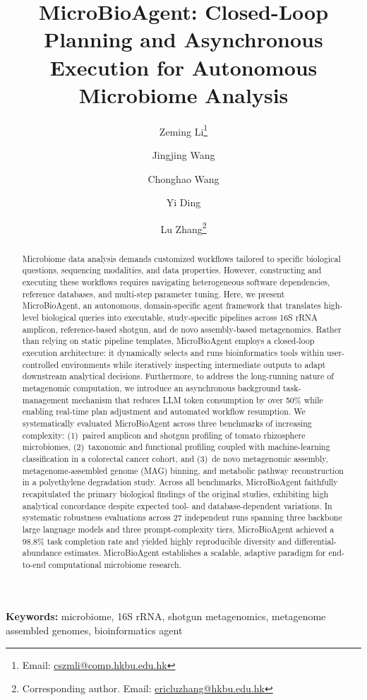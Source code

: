 \documentclass[10pt,letterpaper]{article}
\title{MicroBioAgent: Closed-Loop Planning and Asynchronous Execution for Autonomous Microbiome Analysis}
\author[1]{Zeming Li\thanks{Email: \url{cszmli@comp.hkbu.edu.hk}}}
\author[1]{Jingjing Wang}
\author[1]{Chonghao Wang}
\author[1]{Yi Ding}
\author[1]{Lu Zhang\thanks{Corresponding author. Email: \url{ericluzhang@hkbu.edu.hk}}}
\affil[1]{Department of Computer Science, Hong Kong Baptist University, Hong Kong SAR 999077, China}
\date{}
\begin{document}
\maketitle

\begin{abstract}
Microbiome data analysis demands customized workflows tailored to specific
biological questions, sequencing modalities, and data properties.  However,
constructing and executing these workflows requires navigating heterogeneous
software dependencies, reference databases, and multi-step parameter tuning.
Here, we present MicroBioAgent, an autonomous, domain-specific agent framework
that translates high-level biological queries into executable, study-specific
pipelines across 16S rRNA amplicon, reference-based shotgun, and de novo
assembly-based metagenomics.  Rather than relying on static pipeline templates,
MicroBioAgent employs a closed-loop execution architecture: it dynamically
selects and runs bioinformatics tools within user-controlled environments while
iteratively inspecting intermediate outputs to adapt downstream analytical
decisions.  Furthermore, to address the long-running nature of metagenomic
computation, we introduce an asynchronous background task-management mechanism
that reduces LLM token consumption by over 50\% while enabling real-time plan
adjustment and automated workflow resumption.  We systematically evaluated
MicroBioAgent across three benchmarks of increasing complexity: (1)~paired
amplicon and shotgun profiling of tomato rhizosphere microbiomes, (2)~taxonomic
and functional profiling coupled with machine-learning classification in a
colorectal cancer cohort, and (3)~de novo metagenomic assembly,
metagenome-assembled genome (MAG) binning, and metabolic pathway reconstruction
in a polyethylene degradation study.  Across all benchmarks, MicroBioAgent
faithfully recapitulated the primary biological findings of the original
studies, exhibiting high analytical concordance despite expected tool- and
database-dependent variations.  In systematic robustness evaluations across 27
independent runs spanning three backbone large language models and three
prompt-complexity tiers, MicroBioAgent achieved a 98.8\% task completion rate
and yielded highly reproducible diversity and differential-abundance estimates.
MicroBioAgent establishes a scalable, adaptive paradigm for end-to-end
computational microbiome research.
\end{abstract}

\vspace{0.75em}
\noindent\textbf{Keywords:} microbiome, 16S rRNA, shotgun metagenomics, metagenome assembled genomes, bioinformatics agent
\end{document}
